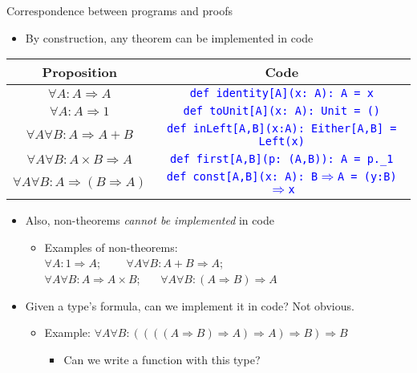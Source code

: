 \documentclass[english]{beamer}
\providecommand{\tabularnewline}{\\}
\begin{document}
\begin{frame}{Correspondence between programs and proofs}

\begin{itemize}
\item By construction, any theorem can be implemented in code
\end{itemize}
\begin{center}
\begin{tabular}{|c|c|}
\hline 
\textbf{Proposition} &
\textbf{Code}\tabularnewline
\hline 
\hline 
$\forall A:A\Rightarrow A$ &
\texttt{\textcolor{blue}{\footnotesize{}def identity{[}A{]}(x:\ A):\ A
= x}}\tabularnewline
\hline 
$\forall A:A\Rightarrow1$ &
\texttt{\textcolor{blue}{\footnotesize{}def toUnit{[}A{]}(x:\ A): Unit
= ()}}\tabularnewline
\hline 
$\forall A\forall B:A\Rightarrow A+B$ &
\texttt{\textcolor{blue}{\footnotesize{}def inLeft{[}A,B{]}(x:A):\ Either{[}A,B{]}
= Left(x)}}\tabularnewline
\hline 
$\forall A\forall B:A\times B\Rightarrow A$ &
\texttt{\textcolor{blue}{\footnotesize{}def first{[}A,B{]}(p:\ (A,B)):\ A
= p.\_1}}\tabularnewline
\hline 
$\forall A\forall B:A\Rightarrow(B\Rightarrow A)$ &
\texttt{\textcolor{blue}{\footnotesize{}def const{[}A,B{]}(x:\ A):\ B$\Rightarrow$A
= (y:B)$\Rightarrow$x}}\tabularnewline
\hline 
\end{tabular}
\par\end{center}
\begin{itemize}
\item Also, non-theorems \emph{cannot be implemented} in code 
\begin{itemize}
\item Examples of non-theorems:\\
 $\forall A:1\Rightarrow A$; \  \  $\quad\forall A\forall B:A+B\Rightarrow A$;
\\
$\forall A\forall B:A\Rightarrow A\times B$; \  $\quad\forall A\forall B:(A\Rightarrow B)\Rightarrow A$
\end{itemize}
\item Given a type's formula, can we implement it in code? Not obvious.
\begin{itemize}
\item Example: $\forall A\forall B:((((A\Rightarrow B)\Rightarrow A)\Rightarrow A)\Rightarrow B)\Rightarrow B$
\begin{itemize}
\item Can we write a function with this type?
\end{itemize}
\end{itemize}
\end{itemize}
\end{frame}
\end{document}
